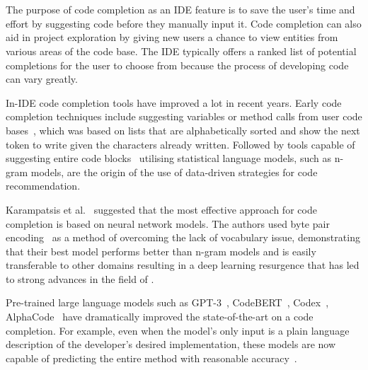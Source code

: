 \section{\cct{}}
The purpose of code completion as an IDE feature is to save the user's time and effort by suggesting code before they manually input it. Code completion can also aid in project exploration by giving new users a chance to view entities from various areas of the code base. The IDE typically offers a ranked list of potential completions for the user to choose from because the process of developing code can vary greatly.

In-IDE code completion tools have improved a lot in recent years. Early code completion techniques include suggesting variables or method calls from user code bases~\cite{mandelin2005}, which was based on lists that are alphabetically sorted and show the next token to write given the characters already written.
Followed by tools capable of suggesting entire code blocks~\cite{Ciniselli2021} utilising statistical language models, such as n-gram models, are the origin of the use of data-driven strategies for code recommendation. 

Karampatsis et al.~\cite{karampatsis} suggested that the most effective approach for code completion is based on neural network models. 
The authors used byte pair encoding~\cite{BPE} as a method of overcoming the lack of vocabulary issue, demonstrating that their best model performs better than n-gram models and is easily transferable to other domains 
resulting in a deep learning resurgence that has led to strong advances in the field of \cct{}. 

Pre-trained large language models such as GPT-3~\cite{Gpt3}, CodeBERT~\cite{codebert}, Codex~\cite{copilot}, AlphaCode~\cite{alphacode} have dramatically improved the state-of-the-art on a code completion. 
For example, even when the model's only input is a plain language description of the developer's desired implementation, these models are now capable of predicting the entire method with reasonable accuracy~\cite{copilot}.